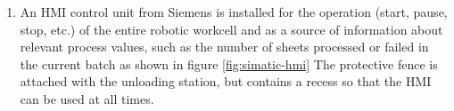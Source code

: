 \begin{enumerate}
    \item An HMI control unit from Siemens is installed for the operation (start, pause, stop, etc.) of the entire robotic workcell and as
    a source of information about relevant process values, such as the number of sheets processed or failed in the current batch as shown in figure \ref{fig:simatic-hmi} The protective fence is attached with the unloading station, but contains a recess so that the HMI can be used at all times.
\end{enumerate}
